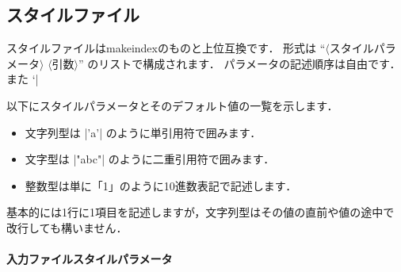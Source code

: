 \documentclass[a4paper,dvipdfmx]{jsarticle}
\newcommand{\SoftName}[1]{\textsf{#1}}
\newcommand{\jMeta}[1]{$\langle$\mbox{}\textsf{#1}\mbox{}$\rangle$}
\begin{document}
\subsection{スタイルファイル}

スタイルファイルは\SoftName{makeindex}のものと上位互換です．
形式は ``\jMeta{スタイルパラメータ} \jMeta{引数}'' のリストで構成されます．
パラメータの記述順序は自由です．また `|%

以下にスタイルパラメータとそのデフォルト値の一覧を示します．
\begin{itemize}
 \item 文字列型は |'a'| のように単引用符で囲みます．
 \item 文字型は |"abc"| のように二重引用符で囲みます．
 \item 整数型は単に「1」のように10進数表記で記述します．
\end{itemize}
基本的には1行に1項目を記述しますが，文字列型はその値の直前や値の途中で
改行しても構いません．

\paragraph{入力ファイルスタイルパラメータ}
\end{document}
